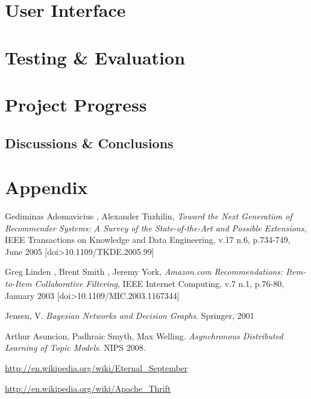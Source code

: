 \documentclass[11pt,letterpaper]{article}
\begin{document}
\section{User Interface}


\section{Testing \& Evaluation}

\section{Project Progress}

\subsection{Discussions \& Conclusions}

\section{Appendix}

\newpage
\newpage
\begin{thebibliography}{6}
   Gediminas Adomavicius , Alexander Tuzhilin, \textit{Toward the Next Generation of Recommender Systems: A Survey of the State-of-the-Art and Possible Extensions}, IEEE Transactions on Knowledge and Data Engineering, v.17 n.6, p.734-749, June 2005  [doi>10.1109/TKDE.2005.99]

   Greg Linden , Brent Smith , Jeremy York, \textit{Amazon.com Recommendations: Item-to-Item Collaborative Filtering}, IEEE Internet Computing, v.7 n.1, p.76-80, January 2003  [doi>10.1109/MIC.2003.1167344]

   Jensen, V. \textit{Bayesian Networks and Decision Graphs}. Springer, 2001

   Arthur Asuncion, Padhraic Smyth, Max Welling. \textit{Asynchronous Distributed Learning of Topic Models}. NIPS 2008.

   \url{http://en.wikipedia.org/wiki/Eternal\_September}

   \url{http://en.wikipedia.org/wiki/Apache\_Thrift}

\end{thebibliography}
\end{document}
